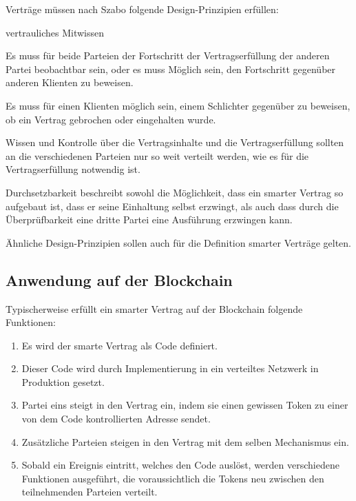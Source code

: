 Verträge müssen nach Szabo folgende Design-Prinzipien erfüllen:
\begin{labeling}{vertrauliches Mitwissen}
	\item[Beobachtbarkeit] Es muss für beide Parteien der Fortschritt der Vertragserfüllung der anderen Partei beobachtbar sein, oder es muss Möglich sein, den Fortschritt gegenüber anderen Klienten zu beweisen.
	\item[Überprüfbarkeit] Es muss für einen Klienten möglich sein, einem Schlichter gegenüber zu beweisen, ob ein Vertrag gebrochen oder eingehalten wurde.
	\item[vertrauliches Mitwissen] Wissen und Kontrolle über die Vertragsinhalte und die Vertragserfüllung sollten an die verschiedenen Parteien nur so weit verteilt werden, wie es für die Vertragserfüllung notwendig ist.
	\item[Durchsetzbarkeit] Durchsetzbarkeit beschreibt sowohl die Möglichkeit, dass ein smarter Vertrag so aufgebaut ist, dass er seine Einhaltung selbst erzwingt, als auch dass durch die Überprüfbarkeit eine dritte Partei eine Ausführung erzwingen kann.
\end{labeling}
\textit{\cite{Szabo.1996}}

Ähnliche Design-Prinzipien sollen auch für die Definition smarter Verträge gelten. 

\subsection{Anwendung auf der Blockchain}
Typischerweise erfüllt ein smarter Vertrag auf der Blockchain folgende Funktionen:
\begin{enumerate}
	\item Es wird der smarte Vertrag als Code definiert.
	\item Dieser Code wird durch Implementierung in ein verteiltes Netzwerk in Produktion gesetzt.
	\item Partei eins steigt in den Vertrag ein, indem sie einen gewissen Token zu einer von dem Code kontrollierten Adresse sendet.
	\item Zusätzliche Parteien steigen in den Vertrag mit dem selben Mechanismus ein.
	\item Sobald ein Ereignis eintritt, welches den Code auslöst, werden verschiedene Funktionen ausgeführt, die voraussichtlich die Tokens neu zwischen den teilnehmenden Parteien verteilt.
\end{enumerate}
\textit{\cite{Valkenburgh.2015}}

